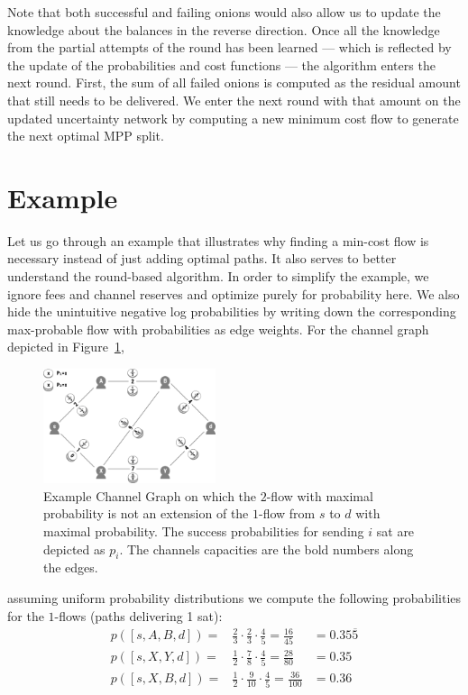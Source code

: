 \documentclass[10pt,twocolumn]{article}
\begin{document}
Note that both successful and failing onions would also allow us to update the knowledge about the balances in the reverse direction.
Once all the knowledge from the partial attempts of the round has been learned --- which is reflected by the update of the probabilities and cost functions --- the algorithm enters the next round.
First, the sum of all failed onions is computed as the residual amount that still needs to be delivered.
We enter the next round with that amount on the updated uncertainty network by computing a new minimum cost flow to generate the next optimal MPP split.


\section{Example}
Let us go through an example that illustrates why finding a min-cost flow is necessary instead of just adding optimal paths.
It also serves to better understand the round-based algorithm.
In order to simplify the example, we ignore fees and channel reserves and optimize purely for probability here.
We also hide the unintuitive negative log probabilities by writing down the corresponding max-probable flow with probabilities as edge weights.
For the channel graph depicted in Figure~\ref{fig:counterexample},
\begin{figure}[htpb]
  \center
  \includegraphics[width=0.45\textwidth]{img/counterexample.png}
  \caption{Example Channel Graph on which the $2$-flow with maximal probability is not an extension of the $1$-flow from  $s$ to $d$ with maximal probability. The success probabilities for sending $i$ sat are depicted as $p_i$. The channels capacities are the bold numbers along the edges.}
  \label{fig:counterexample}
\end{figure}
assuming uniform probability distributions we compute the following probabilities for the $1$-flows (paths delivering 1 sat):
\[
\begin{aligned}
p([s,A,B,d]) = & \frac{2}{3}\cdot\frac{2}{3}\cdot\frac{4}{5}=\frac{16}{45} &= 0.35\overline{5} \\
p([s,X,Y,d]) = & \frac{1}{2}\cdot\frac{7}{8}\cdot\frac{4}{5}=\frac{28}{80} &= 0.35 \\
p([s,X,B,d]) = & \frac{1}{2}\cdot\frac{9}{10}\cdot\frac{4}{5}=\frac{36}{100} &= 0.36 \\
\end{aligned}
\]
\end{document}
